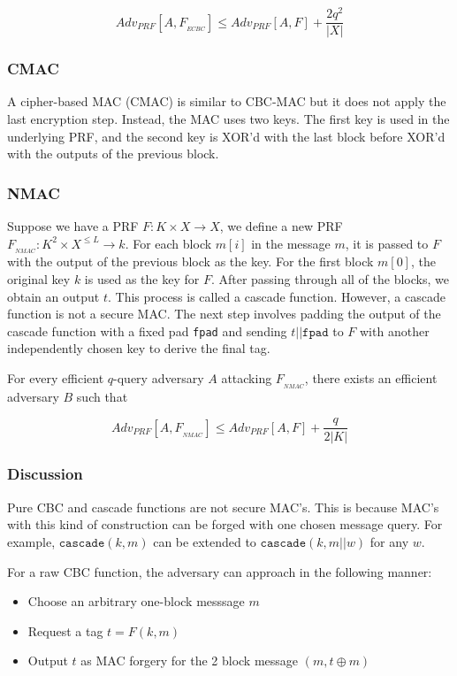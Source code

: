 \documentclass{article}
\begin{document}
\begin{multicols}{2}
$$
Adv_{PRF}[A,F_{_{ECBC}}] \leq Adv_{PRF}[A, F] + \frac{2q^2}{|X|}
$$

\subsubsection{CMAC}

A cipher-based MAC (CMAC) is similar to CBC-MAC but it does not apply the last encryption step. Instead, the MAC uses two keys. The first key is used in the underlying PRF, and the second key is XOR'd with the last block before XOR'd with the outputs of the previous block.

\subsubsection{NMAC}

Suppose we have a PRF $F: K \times X \rightarrow X$, we define a new PRF $F_{_{NMAC}}: K^2 \times X^{\leq L} \rightarrow k$. For each block $m[i]$ in the message $m$, it is passed to $F$ with the output of the previous block as the key. For the first block $m[0]$, the original key $k$ is used as the key for $F$. After passing through all of the blocks, we obtain an output $t$. This process is called a cascade function. However, a cascade function is not a secure MAC. The next step involves padding the output of the cascade function with a fixed pad \texttt{fpad} and sending $t || \mathtt{fpad}$ to $F$ with another independently chosen key to derive the final tag.

For every efficient $q$-query adversary $A$ attacking $F_{_{NMAC}}$, there exists an efficient adversary $B$ such that

$$
Adv_{PRF}[A,F_{_{NMAC}}] \leq Adv_{PRF}[A, F] + \frac{q}{2|K|}
$$

\subsubsection{Discussion}

Pure CBC and cascade functions are not secure MAC's. This is because MAC's with this kind of construction can be forged with one chosen message query. For example, $\mathtt{cascade}(k,m)$ can be extended to $\mathtt{cascade}(k,m||w)$ for any $w$.

For a raw CBC function, the adversary can approach in the following manner:

\begin{itemize}
    \item Choose an arbitrary one-block messsage $m$
    \item Request a tag $t = F(k,m)$
    \item Output $t$ as MAC forgery for the 2 block message $(m, t \oplus m)$
\end{itemize}


\end{multicols}
\end{document}
